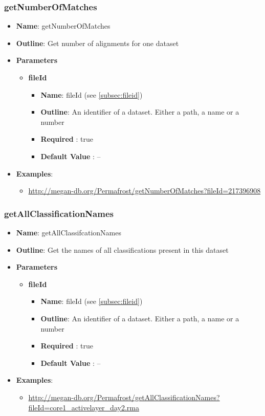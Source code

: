 \documentclass[11pt]{article}
\begin{document}
\subsubsection{getNumberOfMatches}

\begin{itemize}
	\item \textbf{Name}: getNumberOfMatches
	\item \textbf{Outline}: Get number of alignments for one dataset
	\item \textbf{Parameters}
		\begin{itemize}
			\item \textbf{fileId}
				\begin{itemize}
					\item \textbf{Name}: fileId (see \ref{subsec:fileid})
					\item \textbf{Outline}: An identifier of a dataset. Either a path, a name or a number
					\item \textbf{Required} : true
					\item \textbf{Default Value} : --
				\end{itemize}
		\end{itemize}
	\item \textbf{Examples}:
		\begin{itemize}
			\item \url{http://megan-db.org/Permafrost/getNumberOfMatches?fileId=217396908}
		\end{itemize}
\end{itemize}


\subsubsection{getAllClassificationNames}
\begin{itemize}
	\item \textbf{Name}: getAllClassifcationNames
	\item \textbf{Outline}: Get the names of all classifications present in this dataset
	\item \textbf{Parameters}
		\begin{itemize}
			\item \textbf{fileId}
				\begin{itemize}
					\item \textbf{Name}: fileId (see \ref{subsec:fileid})
					\item \textbf{Outline}: An identifier of a dataset. Either a path, a name or a number
					\item \textbf{Required} : true
					\item \textbf{Default Value} : --
				\end{itemize}
		\end{itemize}
	\item \textbf{Examples}:
		\begin{itemize}
			\item \url{http://megan-db.org/Permafrost/getAllClassificationNames?fileId=core1_activelayer_day2.rma}
		\end{itemize}
\end{itemize}
\end{document}

